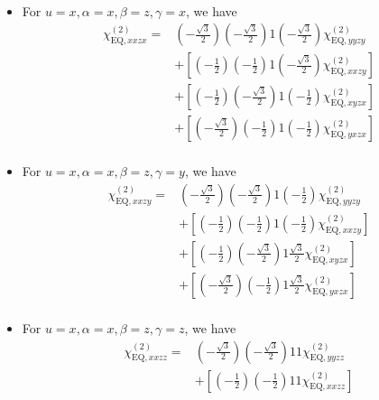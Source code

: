\documentclass[UTF8,10pt,a4paper]{article}
\begin{document}
\begin{itemize}
\begin{align}
&
\end{align}\normalsize
\item For $u=x,\alpha=x,\beta=z,\gamma=x$, we have
\footnotesize\begin{align}
\nonumber\chi_{\text{EQ},xxzx}^{(2)}=&\left(-\frac{\sqrt{3}}{2}\right)\left(-\frac{\sqrt{3}}{2}\right)1\left(-\frac{\sqrt{3}}{2}\right)\chi_{\text{EQ},yyzy}^{(2)}\\
\nonumber&+\left[\left(-\frac{1}{2}\right)\left(-\frac{1}{2}\right)1\left(-\frac{\sqrt{3}}{2}\right)\chi_{\text{EQ},xxzy}^{(2)}\right]\\
\nonumber&+\left[\left(-\frac{1}{2}\right)\left(-\frac{\sqrt{3}}{2}\right)1\left(-\frac{1}{2}\right)\chi_{\text{EQ},xyzx}^{(2)}\right]\\
\nonumber&+\left[\left(-\frac{\sqrt{3}}{2}\right)\left(-\frac{1}{2}\right)1\left(-\frac{1}{2}\right)\chi_{\text{EQ},yxzx}^{(2)}\right]\\
&
\end{align}\normalsize
\item For $u=x,\alpha=x,\beta=z,\gamma=y$, we have
\footnotesize\begin{align}
\nonumber\chi_{\text{EQ},xxzy}^{(2)}=&\left(-\frac{\sqrt{3}}{2}\right)\left(-\frac{\sqrt{3}}{2}\right)1\left(-\frac{1}{2}\right)\chi_{\text{EQ},yyzy}^{(2)}\\
\nonumber&+\left[\left(-\frac{1}{2}\right)\left(-\frac{1}{2}\right)1\left(-\frac{1}{2}\right)\chi_{\text{EQ},xxzy}^{(2)}\right]\\
\nonumber&+\left[\left(-\frac{1}{2}\right)\left(-\frac{\sqrt{3}}{2}\right)1\frac{\sqrt{3}}{2}\chi_{\text{EQ},xyzx}^{(2)}\right]\\
\nonumber&+\left[\left(-\frac{\sqrt{3}}{2}\right)\left(-\frac{1}{2}\right)1\frac{\sqrt{3}}{2}\chi_{\text{EQ},yxzx}^{(2)}\right]\\
&
\end{align}\normalsize
\item For $u=x,\alpha=x,\beta=z,\gamma=z$, we have
\footnotesize\begin{align}
\nonumber\chi_{\text{EQ},xxzz}^{(2)}=&\left(-\frac{\sqrt{3}}{2}\right)\left(-\frac{\sqrt{3}}{2}\right)11\chi_{\text{EQ},yyzz}^{(2)}\\
\nonumber&+\left[\left(-\frac{1}{2}\right)\left(-\frac{1}{2}\right)11\chi_{\text{EQ},xxzz}^{(2)}\right]\\
\nonumber&\\
\nonumber&\\
&
\end{align}\normalsize

\end{itemize}
\end{document}
